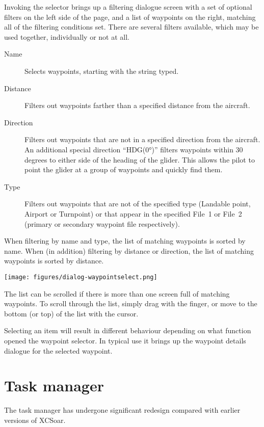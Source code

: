 Invoking the selector brings up a filtering dialogue screen with a set of 
optional filters on the left side of the page, and a list of waypoints on the
right, matching all of the filtering conditions set.
There are several filters available, which may be used together,
individually or not at all.
\begin{description}
\item[Name] Selects waypoints, starting with the string typed.
\item[Distance] Filters out waypoints farther than a specified distance from the 
  aircraft.
\item[Direction] Filters out waypoints that are not in a specified direction 
  from the aircraft. 
  An additional special direction ``HDG(0°)'' filters waypoints within 30
  degrees to either side of the heading of the glider.  This allows the pilot 
  to point the glider at a group of waypoints and quickly find them.
\item[Type] Filters out waypoints that are not of the specified type
(Landable point, Airport or Turnpoint) or that appear in the specified File~1 or
File~2 (primary or secondary waypoint file respectively).
\end{description}
When filtering by name and type, the list of matching waypoints is
sorted by name. When (in addition) filtering by distance or direction,
 the list of matching waypoints is sorted by distance.

\begin{center}
\texttt{[image: figures/dialog-waypointselect.png]}
\end{center}

The list can be scrolled if there is more than one screen full of
matching waypoints.  To scroll through the list, simply drag with the finger, or
move to the bottom (or top) of the list with the cursor.   

Selecting an item will result in different behaviour
depending on what function opened the waypoint selector.  In typical
use it brings up the waypoint details dialogue for the selected
waypoint.

\section{Task manager}\label{sec:task-manager-dialog}
\begin{it}  The task manager has undergone significant redesign compared with 
earlier versions of XCSoar.\end{it}


